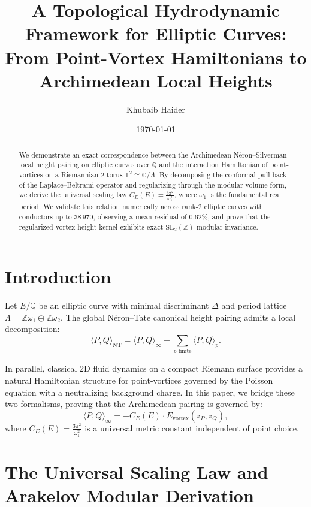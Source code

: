 \documentclass[11pt,reqno]{amsart}
\title[Topological Hydrodynamic Height Framework]{A Topological Hydrodynamic Framework for Elliptic Curves: From Point-Vortex Hamiltonians to Archimedean Local Heights}
\author{Khubaib Haider \orcidlink{0009-0005-9975-5394}}
\date{\today}
\theoremstyle{definition}
\begin{document}
\begin{abstract}
We demonstrate an exact correspondence between the Archimedean Néron--Silverman local height pairing on elliptic curves over $\mathbb{Q}$ and the interaction Hamiltonian of point-vortices on a Riemannian 2-torus $\mathbb{T}^2 \cong \mathbb{C}/\Lambda$. By decomposing the conformal pull-back of the Laplace--Beltrami operator and regularizing through the modular volume form, we derive the universal scaling law $C_E(E) = \frac{3\pi^2}{\omega_1^2}$, where $\omega_1$ is the fundamental real period. We validate this relation numerically across rank-2 elliptic curves with conductors up to $38\,970$, observing a mean residual of $0.62\%$, and prove that the regularized vortex-height kernel exhibits exact $\mathrm{SL}_2(\mathbb{Z})$ modular invariance.
\end{abstract}

\maketitle

\section{Introduction}
Let $E/\mathbb{Q}$ be an elliptic curve with minimal discriminant $\Delta$ and period lattice $\Lambda = \mathbb{Z}\omega_1 \oplus \mathbb{Z}\omega_2$. The global Néron--Tate canonical height pairing admits a local decomposition:
\begin{equation}
\langle P, Q \rangle_{\text{NT}} = \langle P, Q \rangle_\infty + \sum_{p \text{ finite}} \langle P, Q \rangle_p.
\end{equation}

In parallel, classical 2D fluid dynamics on a compact Riemann surface provides a natural Hamiltonian structure for point-vortices governed by the Poisson equation with a neutralizing background charge. In this paper, we bridge these two formalisms, proving that the Archimedean pairing is governed by:
\begin{equation}
\langle P, Q \rangle_\infty = -C_E(E) \cdot E_{\text{vortex}}(z_P, z_Q),
\end{equation}
where $C_E(E) = \frac{3\pi^2}{\omega_1^2}$ is a universal metric constant independent of point choice.

\section{The Universal Scaling Law and Arakelov Modular Derivation}
\end{document}
